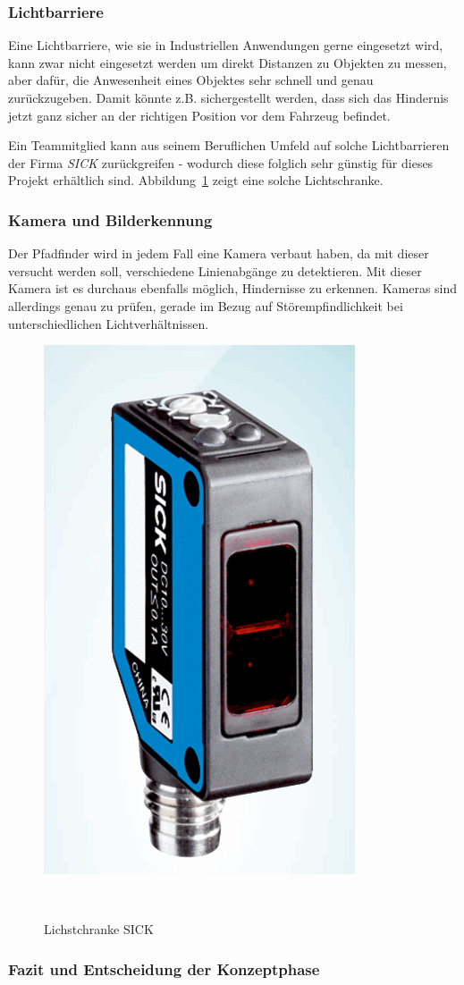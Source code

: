 \documentclass[main.tex]{subfiles} %
\begin{document}
\subsubsection*{Lichtbarriere}
Eine Lichtbarriere, wie sie in Industriellen Anwendungen gerne eingesetzt wird,
kann zwar nicht eingesetzt werden um direkt Distanzen zu Objekten zu messen, aber dafür,
die Anwesenheit eines Objektes sehr schnell und genau zurückzugeben. Damit könnte z.B. sichergestellt werden,
dass sich das Hindernis jetzt ganz sicher an der richtigen Position vor dem Fahrzeug befindet.

Ein Teammitglied kann aus seinem Beruflichen Umfeld auf solche Lichtbarrieren
der Firma \textit{SICK} zurückgreifen - wodurch diese folglich sehr günstig für
dieses Projekt erhältlich sind. Abbildung~\ref{fig:SICK_Sensor} zeigt eine
solche Lichtschranke.

\subsubsection*{Kamera und Bilderkennung}
Der Pfadfinder wird in jedem Fall eine Kamera verbaut haben, da mit dieser
versucht werden soll, verschiedene Linienabgänge zu detektieren. Mit dieser Kamera
ist es durchaus ebenfalls möglich, Hindernisse zu erkennen. Kameras sind allerdings
genau zu prüfen, gerade im Bezug auf Störempfindlichkeit bei unterschiedlichen Lichtverhältnissen.

\begin{figure}[h!]
    \centering
    \includegraphics[width=0.25\linewidth]{./fig_Hinderniserkennung/SICK_Lichtschranke.png}
    \caption{Lichstchranke SICK}~\label{fig:SICK_Sensor}
\end{figure}

\subsubsection*{Fazit und Entscheidung der Konzeptphase}
\end{document}
